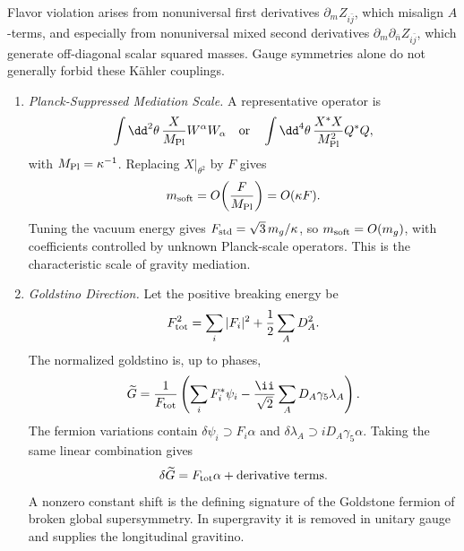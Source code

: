 \begin{enumerate}
\begin{enumerate}
      Flavor violation arises from nonuniversal first derivatives
      \(\partial_mZ_{i\bar j}\), which misalign \(A\)-terms, and especially
      from nonuniversal mixed second derivatives
      \(\partial_m\partial_{\bar n}Z_{i\bar j}\), which generate off-diagonal
      scalar squared masses.  Gauge symmetries alone do not generally forbid
      these Kähler couplings.
  \end{enumerate}

  \begin{enumerate}
    \item \emph{Planck-Suppressed Mediation Scale.}
    A representative operator is
      \[
        \int \dd^2\theta\,\frac{X}{M_{\rm Pl}}W^\alpha W_\alpha
        \quad\hbox{or}\quad
        \int \dd^4\theta\,\frac{X^*X}{M_{\rm Pl}^2}Q^*Q,
      \]
      with \(M_{\rm Pl}=\kappa^{-1}\).  Replacing
      \(X|_{\theta^2}\) by \(F\) gives
      \[
        m_{\rm soft}=O\!\left(\frac{F}{M_{\rm Pl}}\right)
                    =O(\kappa F).
      \]
      Tuning the vacuum energy gives
      \(F_{\rm std}=\sqrt3\,m_g/\kappa\), so
      \(m_{\rm soft}=O(m_g)\), with coefficients controlled by unknown
      Planck-scale operators.  This is the characteristic scale of gravity
      mediation.
    \item \emph{Goldstino Direction.}
    Let the positive breaking energy be
      \[
        F_{\rm tot}^2=\sum_i|F_i|^2+\frac12\sum_A D_A^2.
      \]
      The normalized goldstino is, up to phases,
      \[
        \widetilde G
          =\frac1{F_{\rm tot}}\left(
            \sum_iF_i^*\psi_i
            -\frac{\ii}{\sqrt2}\sum_AD_A\gamma_5\lambda_A
          \right).
      \]
      The fermion variations contain
      \(\delta\psi_i\supset F_i\alpha\) and
      \(\delta\lambda_A\supset iD_A\gamma_5\alpha\).  Taking the same linear
      combination gives
      \[
        \delta\widetilde G=F_{\rm tot}\alpha+\text{derivative terms}.
      \]
      A nonzero constant shift is the defining signature of the Goldstone
      fermion of broken global supersymmetry.  In supergravity it is removed
      in unitary gauge and supplies the longitudinal gravitino.
  \end{enumerate}


\end{enumerate}
